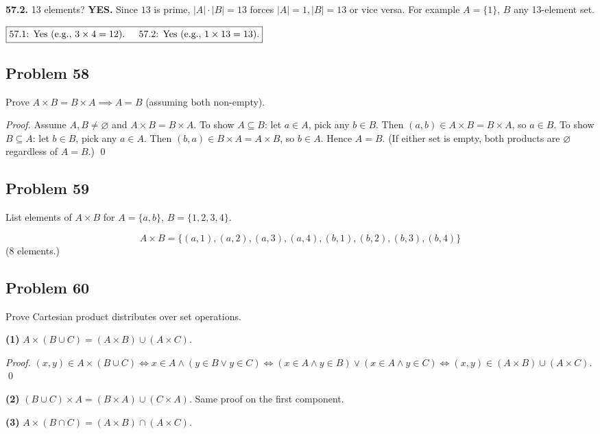 \textbf{57.2.} 13 elements? \textbf{YES.} Since $13$ is prime, $|A| \cdot |B| = 13$ forces $|A|=1, |B|=13$ or vice versa. For example $A=\{1\}$, $B$ any 13-element set.

$\boxed{\text{57.1: Yes (e.g., } 3 \times 4 = 12\text{). \quad 57.2: Yes (e.g., } 1 \times 13 = 13\text{).}}$

\subsection*{Problem 58}
Prove $A \times B = B \times A \implies A = B$ (assuming both non-empty).

\textit{Proof.} Assume $A, B \neq \varnothing$ and $A \times B = B \times A$.
To show $A \subseteq B$: let $a \in A$, pick any $b \in B$. Then $(a,b) \in A \times B = B \times A$, so $a \in B$.
To show $B \subseteq A$: let $b \in B$, pick any $a \in A$. Then $(b,a) \in B \times A = A \times B$, so $b \in A$.
Hence $A = B$. (If either set is empty, both products are $\varnothing$ regardless of $A = B$.) \qed

\subsection*{Problem 59}
List elements of $A \times B$ for $A = \{a,b\}$, $B = \{1,2,3,4\}$.

\[
  \boxed{A \times B = \{(a,1),(a,2),(a,3),(a,4),(b,1),(b,2),(b,3),(b,4)\}}
\]
(8 elements.)

\subsection*{Problem 60}
Prove Cartesian product distributes over set operations.

\textbf{(1)} $A \times (B \cup C) = (A \times B) \cup (A \times C)$.

\textit{Proof.} $(x,y) \in A \times (B \cup C) \iff x \in A \land (y \in B \lor y \in C) \iff (x \in A \land y \in B) \lor (x \in A \land y \in C) \iff (x,y) \in (A\times B) \cup (A \times C)$. \qed

\textbf{(2)} $(B \cup C) \times A = (B \times A) \cup (C \times A)$. Same proof on the first component.

\textbf{(3)} $A \times (B \cap C) = (A \times B) \cap (A \times C)$.

